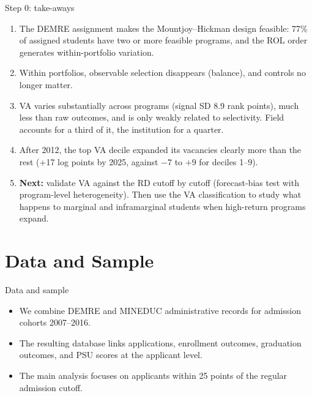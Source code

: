 \documentclass{beamer}
\begin{document}
\begin{frame}{Step 0: take-aways}
\small
\begin{enumerate}
    \setlength{\itemsep}{5pt}
    \item The DEMRE assignment makes the Mountjoy--Hickman design feasible: 77\% of assigned students have two or more feasible programs, and the ROL order generates within-portfolio variation.
    \item Within portfolios, observable selection disappears (balance), and controls no longer matter.
    \item VA varies substantially across programs (signal SD 8.9 rank points), much less than raw outcomes, and is only weakly related to selectivity. Field accounts for a third of it, the institution for a quarter.
    \item After 2012, the top VA decile expanded its vacancies clearly more than the rest (+17 log points by 2025, against $-7$ to $+9$ for deciles 1--9).
    \item \textbf{Next:} validate VA against the RD cutoff by cutoff (forecast-bias test with program-level heterogeneity). Then use the VA classification to study what happens to marginal and inframarginal students when high-return programs expand.
\end{enumerate}
\end{frame}

\section{Data and Sample}

\begin{frame}{Data and sample}

\small

\begin{itemize}

\item We combine DEMRE and MINEDUC administrative records for admission cohorts 2007--2016.

\item The resulting database links applications, enrollment outcomes, graduation outcomes, and PSU scores at the applicant level.

\item The main analysis focuses on applicants within 25 points of the regular admission cutoff.

\end{itemize}

\vspace{0.15cm}

\centering
\scriptsize



\end{frame}
\end{document}
